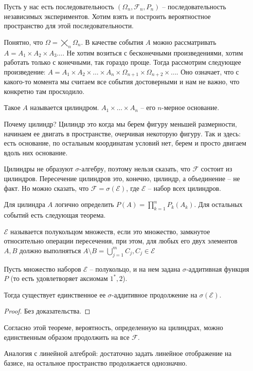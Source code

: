 Пусть у нас есть последовательность $(\Omega_n, \mathcal{F}_n, P_n)$ -- последовательность независимых экспериментов.
Хотим взять и построить вероятностное пространство для этой последовательности.

Понятно, что $\Omega = \bigtimes\limits_n \Omega_n$.
В качестве события $A$ можно рассматривать $A = A_1 \times A_2 \times A_3 \dots$. 
Не хотим возиться с бесконечными произведениями, хотим работать только с конечными, так гораздо проще. 
Тогда рассмотрим следующее произведение: $A = A_1 \times A_2 \times \dots \times A_n \times \Omega_{n+1} \times \Omega_{n+2} \times \dots$.
Оно означает, что с какого-то момента мы считаем все события достоверными и нам не важно, что конкретно там просходило. 

\begin{Def}
Такое $A$ называется цилиндром. $A_1 \times \dots \times A_n$ -- его $n$-мерное основание.
\end{Def}
\begin{Rem}
Почему цилиндр? Цилиндр это когда мы берем фигуру меньшей размерности, начинаем ее двигать  в пространстве, очерчивая некоторую фигуру. 
Так и здесь: есть основание, по остальным координатам условий нет, берем и просто двигаем вдоль них основание.
\end{Rem}

Цилиндры не образуют $\sigma$-алгебру, поэтому нельзя сказать, что $\mathcal{F}$ состоит из цилиндров.
Пересечение цилиндров это, конечно, цилиндр, а объединение -- не факт. Но можно сказать, что $\mathcal{F} = \sigma(\mathcal{E})$, где $\mathcal{E}$ -- набор всех цилиндров.

Для цилиндра $A$ логично определить $P(A) = \prod\limits_{k=1}^n P_k(A_k)$. 
Для остальных событий есть следующая теорема.
\begin{Def}
$\mathcal{E}$ называется полукольцом множеств, если это множество, замкнутое относительно операции пересечения, при этом, 
для любых его двух элементов $A, B$ должно выполняться $A \setminus B = \bigcup\limits_{j=1}^m C_j, C_j \in \mathcal{E}$
\end{Def}
\begin{theorem}[Каратеодори]
Пусть множество наборов $\mathcal{E}$ -- полукольцо, и на нем задана $\sigma$-аддитивная функция $P$ (то есть удовлетворяет аксиомам $1^*, 2$).

Тогда существует единственное ее $\sigma$-аддитивное продолжение на $\sigma(\mathcal{E})$.
\end{theorem}
\begin{proof}
Без доказательства.
\end{proof}
Согласно этой теореме, вероятность, определенную на цилиндрах,  можно единственным образом продолжить на все $\mathcal{F}$.
\begin{Rem}
Аналогия с линейной алгеброй: достаточно задать линейное отображение на базисе, на остальное пространство продолжается однозначно.
\end{Rem} 

